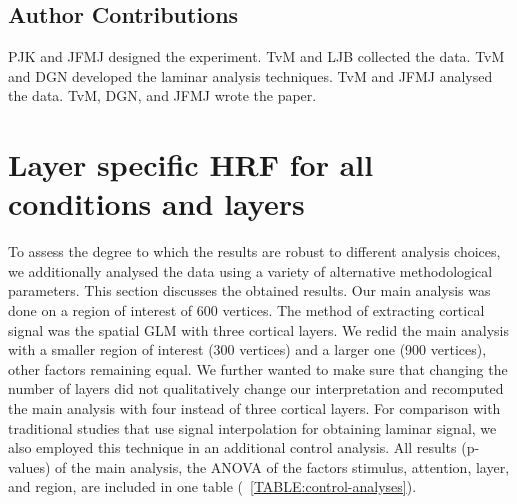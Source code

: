 \documentclass[9pt,lineno]{aperture}
\begin{document}
\subsection{Author Contributions}
PJK and JFMJ designed the experiment. TvM and LJB collected the data. TvM and DGN developed the laminar analysis techniques. TvM and JFMJ analysed the data. TvM, DGN, and JFMJ wrote the paper. 

\nocite{*} %




\appendix
\begin{appendixbox}
\label{first:app}
\section{Layer specific HRF for all conditions and layers}
To assess the degree to which the results are robust to different analysis choices, we additionally analysed the data using a variety of alternative methodological parameters. This section discusses the obtained results. Our main analysis was done on a region of interest of 600 vertices. The method of extracting cortical signal was the spatial GLM \citep{VanMourik2019} with three cortical layers. We redid the main analysis with a smaller region of interest (300 vertices) and a larger one (900 vertices), other factors remaining equal. We further wanted to make sure that changing the number of layers did not qualitatively change our interpretation and recomputed the main analysis with four instead of three cortical layers. For comparison with traditional studies that use signal interpolation for obtaining laminar signal, we also employed this technique in an additional control analysis. All results (p-values) of the main analysis, the ANOVA of the factors stimulus, attention, layer, and region, are included in one table (~\ref{TABLE:control-analyses}).


\end{appendixbox}
\end{document}
